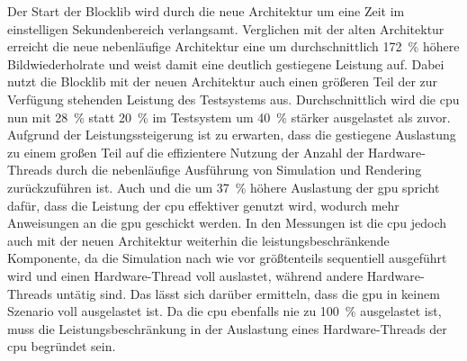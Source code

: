 Der Start der Blocklib wird durch die neue Architektur um eine Zeit im einstelligen Sekundenbereich verlangsamt. Verglichen mit der alten Architektur erreicht die neue nebenläufige Architektur eine um durchschnittlich \SI{172}{\percent} höhere Bildwiederholrate und weist damit eine deutlich gestiegene Leistung auf. Dabei nutzt die Blocklib mit der neuen Architektur auch einen größeren Teil der zur Verfügung stehenden Leistung des Testsystems aus. Durchschnittlich wird die \ac{cpu} nun mit \SI{28}{\percent} statt \SI{20}{\percent} im Testsystem um \SI{40}{\percent} stärker ausgelastet als zuvor. Aufgrund der Leistungssteigerung ist zu erwarten, dass die gestiegene Auslastung zu einem großen Teil auf die effizientere Nutzung der Anzahl der Hardware-Threads durch die nebenläufige Ausführung von Simulation und Rendering zurückzuführen ist. Auch und die um \SI{37}{\percent} höhere Auslastung der \ac{gpu} spricht dafür, dass die Leistung der \ac{cpu} effektiver genutzt wird, wodurch mehr Anweisungen an die \ac{gpu} geschickt werden. In den Messungen ist die \ac{cpu} jedoch auch mit der neuen Architektur weiterhin die leistungsbeschränkende Komponente, da die Simulation nach wie vor größtenteils sequentiell ausgeführt wird und einen Hardware-Thread voll auslastet, während andere Hardware-Threads untätig sind. Das lässt sich darüber ermitteln, dass die \ac{gpu} in keinem Szenario voll ausgelastet ist. Da die \ac{cpu} ebenfalls nie zu \SI{100}{\percent} ausgelastet ist, muss die Leistungsbeschränkung in der Auslastung eines Hardware-Threads der \ac{cpu} begründet sein.